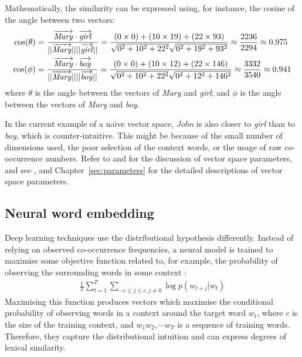 Mathematically, the similarity can be expressed using, for instance, the cosine of the angle between two vectors:
%
\begin{align*}
\cos(\theta) &=
\frac{\ov{\mathit{Mary}}\cdot\ov{\mathit{girl}}}
{||\ov{\mathit{Mary}}||||\ov{\mathit{girl}}||} =
%
\frac{(0\times0) + (10\times19) + (22\times93)}
%
%
%
{\sqrt{0^2 + 10^2 + 22^2}\sqrt{0^2 + 19^2 + 93^2}} \approx
\frac{2236}{2294} \approx 0.975
 \\
\cos(\phi) &=
\frac{\ov{\mathit{Mary}}\cdot\ov{\mathit{boy}}}
{||\ov{\mathit{Mary}}||||\ov{\mathit{boy}}||} =
%
\frac{(0\times0) + (10\times12) + (22\times146)}
{\sqrt{0^2 + 10^2 + 22^2}\sqrt{0^2 + 12^2 + 146^2}} \approx
\frac{3332}{3540} \approx 0.941
\end{align*}
%
where $\theta$ is the angle between the vectors of \textit{Mary} and \textit{girl}; and $\phi$ is the angle between the vectors of \textit{Mary} and \textit{boy}.

In the current example of a na{\"\i}ve vector space, \textit{John} is also closer to \textit{girl} than to \textit{boy}, which is counter-intuitive. This might be because of the small number of dimensions used, the poor selection of the context words, or the usage of raw co-occurrence numbers. Refer to  and  for the discussion of vector space parameters, and see ,  and Chapter~\ref{sec:parameters} for the detailed descriptions of vector space parameters.

\subsection{Neural word embedding}
\label{sec:neural-embedding}

Deep learning techniques use the distributional hypothesis differently. Instead of relying on observed co-occurrence frequencies, a neural model is trained to maximise some objective function related to, for example, the probability of observing the surrounding words in some context \cite{mikolov2013distributed}:
%
%
%
%
\begin{align}
 \frac{1}{T}\sum^{T}_{t=1}\sum_{-c \leq j \leq c, j\neq0} \log p(w_{t+j}|w_t)
  \label{eq:objective-func}
\end{align}
%
\noindent
Maximising this function produces vectors which maximise the
conditional probability of observing words in a context around the
target word $w_t$, where $c$ is the size of the training context, and
$w_1 w_2, \cdots w_T$ is a sequence of training words. Therefore, they
capture the distributional intuition and can express degrees of
lexical similarity.

